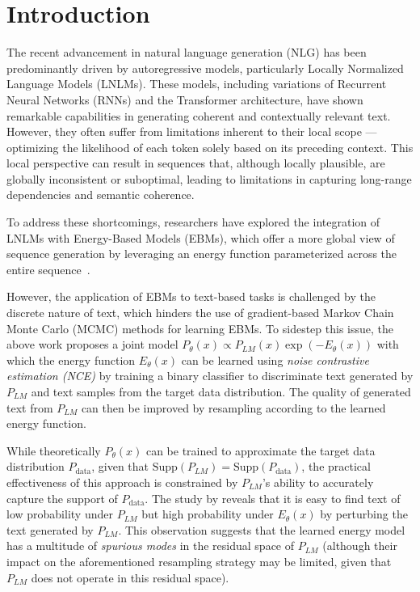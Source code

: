 \documentclass[11pt]{article}
\begin{document}
\section{Introduction}

The recent advancement in natural language generation (NLG) has been predominantly driven by autoregressive models, particularly Locally Normalized Language Models (LNLMs). These models, including variations of Recurrent Neural Networks (RNNs) and the Transformer architecture, have shown remarkable capabilities in generating coherent and contextually relevant text. However, they often suffer from limitations inherent to their local scope --- optimizing the likelihood of each token solely based on its preceding context. This local perspective can result in sequences that, although locally plausible, are globally inconsistent or suboptimal, leading to limitations in capturing long-range dependencies and semantic coherence.

To address these shortcomings, researchers have explored the integration of LNLMs with Energy-Based Models (EBMs), which offer a more global view of sequence generation by leveraging an energy function parameterized across the entire sequence~\citep{wang2018learning,parshakova2019global,deng2019residual}. 

However, the application of EBMs to text-based tasks is challenged by the discrete nature of text, which hinders the use of gradient-based Markov Chain Monte Carlo (MCMC) methods for learning EBMs.
To sidestep this issue, the above work proposes a joint model $P_\theta(x) \propto P_{L M}(x) \exp \left(-E_\theta(x)\right)$ with which the energy function  $E_\theta(x)$ can be learned using \emph{noise contrastive estimation (NCE)} by training a binary classifier to discriminate text generated by $P_{L M}$ and text samples from the target data distribution. The quality of generated text from $P_{L M}$ can then be improved by resampling according to the learned energy function.


While theoretically \( P_\theta(x) \) can be trained to approximate the target data distribution \( P_\text{data} \), given that \( \text{Supp}(P_{LM}) = \text{Supp}(P_\text{data}) \), the practical effectiveness of this approach is constrained by \( P_{LM} \)'s ability to accurately capture the support of \( P_\text{data} \).
The study by \cite{bakhtin2019real} reveals that it is easy to find text of low probability under $P_{L M}$ but  high probability under  $E_\theta(x)$ by perturbing the text generated by $P_{L M}$. This observation suggests that the learned energy model has a multitude of \emph{spurious modes} in the residual space of \(P_{LM}\) (although their impact on the aforementioned resampling strategy may be limited, given that \(P_{LM}\) does not operate in this residual space).
\end{document}

